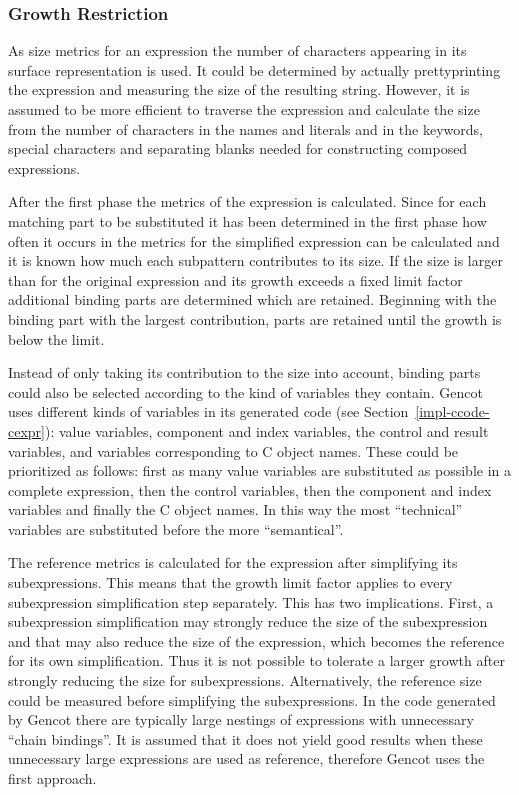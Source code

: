 \subsubsection{Growth Restriction}

As size metrics for an expression the number of characters appearing in its surface representation is used. It could be determined
by actually prettyprinting the expression and measuring the size of the resulting string. However, it is assumed to be more
efficient to traverse the expression and calculate the size from the number of characters in the names and literals and in
the keywords, special characters and separating blanks needed for constructing composed expressions.

After the first phase the metrics of the  expression is calculated. Since for each matching part to be substituted it 
has been determined in the first phase how often it occurs in  the metrics for the simplified expression can be 
calculated and it is known how much each subpattern contributes to its size. If the size is larger than for the original 
expression and its growth exceeds a fixed limit factor additional binding parts are determined which are retained. 
Beginning with the binding part with the largest contribution, parts are retained until the growth is below the limit.

Instead of only taking its contribution to the size into account, binding parts could also be selected according to the kind of
variables they contain. 
Gencot uses different kinds of variables in its generated code (see Section~\ref{impl-ccode-cexpr}): value variables, component and
index variables, the control and result variables, and variables corresponding to C object names. These could be prioritized
as follows: first as many value 
variables are substituted as possible in a complete expression, then the control variables, then the component and index variables and
finally the C object names. In this way the most ``technical'' variables are substituted before the more ``semantical''.

The reference metrics is calculated for the expression after simplifying its subexpressions. This means that the growth limit factor
applies to every subexpression simplification step separately. This has two implications. First, a subexpression simplification
may strongly reduce the size of the subexpression and that may also reduce the size of the  expression, which becomes 
the reference for its own simplification. Thus it is not possible to tolerate a larger growth after strongly reducing the size for
subexpressions. Alternatively, the reference size could be measured before simplifying the subexpressions. In the code generated
by Gencot there are typically large nestings of  expressions with unnecessary ``chain bindings''. It is assumed that it
does not yield good results when these unnecessary large expressions are used as reference, therefore Gencot uses the first approach.

